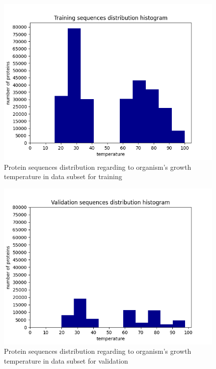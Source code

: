 \documentclass[12pt]{article}
\begin{document}
	\begin{figure}[h!]
		\centering
		\includegraphics[scale=0.75]{training_v2_histo.png}

		\caption{Protein sequences distribution 
		regarding to organism's growth temperature
		in data subset for training}
		\label{figure:trainingHist003}
	\end{figure}

	\begin{figure}[h!]
		\centering
		\includegraphics[scale=0.75]{validation_v2_histo.png}

		\caption{Protein sequences distribution 
		regarding to organism's growth temperature
		in data subset for validation}
		\label{figure:validationHist003}
	\end{figure}
\end{document}
